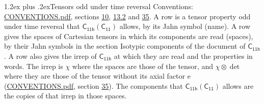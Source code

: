 \documentclass[10pt,a4paper]{article}
\makeatletter
\renewcommand\section{\@startsection{section}{1}{\z@}{-3ex plus -1ex minus -.2ex}%
  {1.2ex plus .2ex}{\normalfont\large\sffamily\bfseries\color{parttitle}}}
\numberwithin{equation}{section}
\newcommand{\grp}[1]{\mathsf{#1}}
\newcommand{\irrprod}{\otimes}
\makeatother
\begin{document}
\section{Tensors odd under time reversal}\label{s:time_odd}
Conventions: \href{../../CONVENTIONS.pdf}{CONVENTIONS.pdf}, sections \href{../../../rotation/CONVENTIONS.pdf\#conv.10}{10}, \href{../../../rotation/CONVENTIONS.pdf\#conv.13.2}{13.2} and \href{../../CONVENTIONS.pdf\#conv.35}{35}.
\leavevmode\label{n:head.name.property}A row is a tensor property odd under time reversal that $\grp{C_{11h}}(\grp{C_{11}})$ allows, by its Jahn symbol (name). \label{n:head.spaces}A row gives the spaces of Cartesian tensors in which its components are read (spaces), by their Jahn symbols in the section Isotypic components of the document of \href{../../../rotation/data/pdf/C11h.pdf}{$\grp{C_{11h}}$}. \label{n:head.properties}A row also gives the irrep of $\grp{C_{11h}}$ at which they are read and the properties in words. The irrep is $\chi$ where the spaces are those of the tensor, and $\chi \irrprod \det$ where they are those of the tensor without its axial factor e (\href{../../CONVENTIONS.pdf}{CONVENTIONS.pdf}, section \href{../../CONVENTIONS.pdf\#conv.35}{35}). The components that $\grp{C_{11h}}(\grp{C_{11}})$ allows are the copies of that irrep in those spaces.
\end{document}
